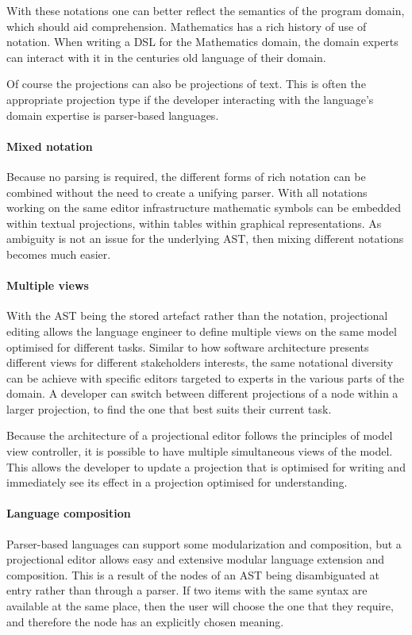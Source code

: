 With these notations one can better reflect the semantics of the program domain, which should aid comprehension.
Mathematics has a rich history of use of notation.
When writing a DSL for the Mathematics domain, the domain experts can interact with it in the centuries old language of their domain.

Of course the projections can also be projections of text.
This is often the appropriate projection type if the developer interacting with the language's domain expertise is parser-based languages.

\paragraph{Mixed notation}
Because no parsing is required, the different forms of rich notation can be combined without the need to create a unifying parser.
With all notations working on the same editor infrastructure mathematic symbols can be embedded within textual projections, within tables within graphical representations.
As ambiguity is not an issue for the underlying AST, then mixing different notations becomes much easier.

\paragraph{Multiple views}
With the AST being the stored artefact rather than the notation, projectional editing allows the language engineer to define multiple views on the same model optimised for different tasks.
Similar to how software architecture presents different views for different stakeholders interests, the same notational diversity can be achieve with specific editors targeted to experts in the various parts of the domain.
A developer can switch between different projections of a node within a larger projection, to find the one that best suits their current task.

Because the architecture of a projectional editor follows the principles of model view controller, it is possible to have multiple simultaneous views of the model.
This allows the developer to update a projection that is optimised for writing and immediately see its effect in a projection optimised for understanding.

\paragraph{Language composition}
Parser-based languages can support some modularization and composition, but a projectional editor allows easy and extensive modular language extension and composition.
This is a result of the nodes of an AST being disambiguated at entry rather than through a parser.
If two items with the same syntax are available at the same place, then the user will choose the one that they require, and therefore the node has an explicitly chosen meaning.

